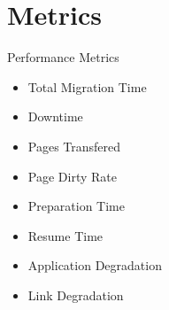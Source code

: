 \section{Metrics}

	\begin{frame}[fragile]{Performance Metrics}

		\begin{itemize}
			\setlength \itemsep{0.7em}
			\item Total Migration Time
			\item Downtime
			\item Pages Transfered
			\item Page Dirty Rate 
			\item Preparation Time
			\item Resume Time
			\item Application Degradation
			\item Link Degradation
		\end{itemize}

	\end{frame}

